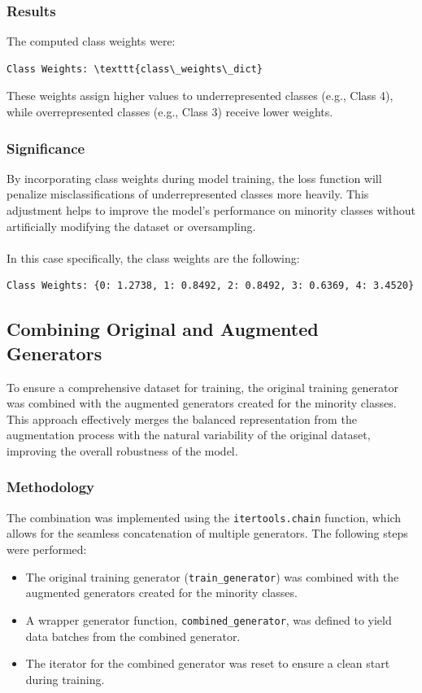 \documentclass{article}
\begin{document}
\subsubsection{Results}

The computed class weights were:
\begin{verbatim}
Class Weights: \texttt{class\_weights\_dict}
\end{verbatim}
These weights assign higher values to underrepresented classes (e.g., Class 4), while overrepresented classes (e.g., Class 3) receive lower weights. 

\subsubsection{Significance}

By incorporating class weights during model training, the loss function will penalize misclassifications of underrepresented classes more heavily. This adjustment helps to improve the model's performance on minority classes without artificially modifying the dataset or oversampling.
\\\\
In this case specifically, the class weights are the following:

\begin{verbatim}
Class Weights: {0: 1.2738, 1: 0.8492, 2: 0.8492, 3: 0.6369, 4: 3.4520}
\end{verbatim}

\subsection{Combining Original and Augmented Generators}

To ensure a comprehensive dataset for training, the original training generator was combined with the augmented generators created for the minority classes. This approach effectively merges the balanced representation from the augmentation process with the natural variability of the original dataset, improving the overall robustness of the model.

\subsubsection{Methodology}

The combination was implemented using the \texttt{itertools.chain} function, which allows for the seamless concatenation of multiple generators. The following steps were performed:
\begin{itemize}
    \item The original training generator (\texttt{train\_generator}) was combined with the augmented generators created for the minority classes.
    \item A wrapper generator function, \texttt{combined\_generator}, was defined to yield data batches from the combined generator.
    \item The iterator for the combined generator was reset to ensure a clean start during training.
\end{itemize}
\end{document}
